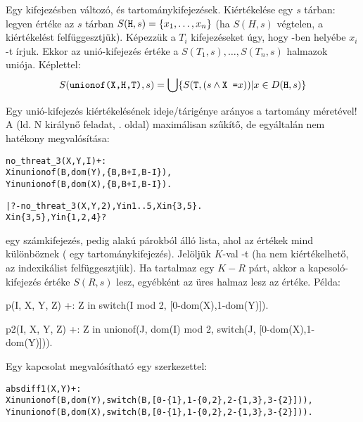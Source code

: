 \label{unio:ind}

Egy  kifejezésben  változó,  és 
tartománykifejezések. Kiértékelése egy $s$ tárban: legyen  értéke
az $s$ tárban $S(\texttt{H},s) = \{x_1, \ldots, x_n\}$ (ha $S(H,s)$ végtelen,
a kiértékelést felfüggesztjük). Képezzük a $T_i$ kifejezéseket úgy, hogy
-ben  helyébe $x_i$-t írjuk. Ekkor az unió-kifejezés értéke
a $S(T_1,s), \ldots, S(T_n,s)$ halmazok uniója. Képlettel:
\[
        S(\texttt{unionof(X,H,T)}, s) = \bigcup \{S(\texttt{T}, (s \wedge \texttt{X =}
        x)) | x \in D(\texttt{H}, s)\}
\]

Egy unió-kifejezés kiértékelésének ideje/tárigénye arányos a 
tartomány méretével!
\br
A  (ld. N királynő feladat, \pageref{no:threat}. oldal) maximálisan
szűkítő, de egyáltalán nem hatékony megvalósítása:

\begin{alltt}
no_threat_3(X, Y, I) +:
        X in unionof(B, dom(Y), \bs\{B,B+I,B-I\}),
        Y in unionof(B, dom(X), \bs\{B,B+I,B-I\}).

| ?- no_threat_3(X, Y, 2), Y in 1..5, X in \{3,5\}.
X in \{3,5\}, Y in \{1,2,4\} ?
\end{alltt}

\label{kapcs:ind}
 egy számkifejezés,  pedig 
alakú párokból álló lista, ahol az  értékek mind
különböznek ( egy tartománykifejezés). Jelöljük $K$-val -t
(ha  nem kiértékelhető, az indexikálist felfüggesztjük).
Ha  tartalmaz egy $K-R$ párt, akkor a kapcsoló-kifejezés értéke
$S(R,s)$ lesz, egyébként az üres halmaz lesz az értéke. Példa:

\begin{prologcode}
p(I, X, Y, Z) +:   Z in switch(I mod 2, [0-dom(X),1-dom(Y)]).

p2(I, X, Y, Z) +:  %
    Z in unionof(J, dom(I) mod 2, switch(J, [0-dom(X),1-dom(Y)])).
\end{prologcode}

Egy  kapcsolat megvalósítható egy  szerkezettel:

\begin{alltt}
% relation(X, [0-\{1\},1-\{0,2\},2-\{1,3\},3-\{2\}], Y) \(\Leftrightarrow |x-y|=1 x,y\in[0,3]\)
absdiff1(X, Y) +:
  X in unionof(B,dom(Y),switch(B,[0-\{1\},1-\{0,2\},2-\{1,3\},3-\{2\}])),
  Y in unionof(B,dom(X),switch(B,[0-\{1\},1-\{0,2\},2-\{1,3\},3-\{2\}])).
\end{alltt}

